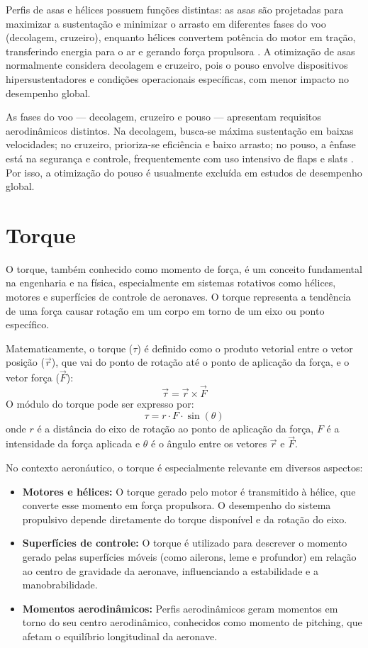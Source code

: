 Perfis de asas e hélices possuem funções distintas: as asas são projetadas para maximizar a sustentação e minimizar o arrasto em diferentes fases do voo (decolagem, cruzeiro), enquanto hélices convertem potência do motor em tração, transferindo energia para o ar e gerando força propulsora \cite{anderson2017fundamentals}. A otimização de asas normalmente considera decolagem e cruzeiro, pois o pouso envolve dispositivos hipersustentadores e condições operacionais específicas, com menor impacto no desempenho global.

As fases do voo — decolagem, cruzeiro e pouso — apresentam requisitos aerodinâmicos distintos. Na decolagem, busca-se máxima sustentação em baixas velocidades; no cruzeiro, prioriza-se eficiência e baixo arrasto; no pouso, a ênfase está na segurança e controle, frequentemente com uso intensivo de flaps e slats \cite{raymer2018aircraft}. Por isso, a otimização do pouso é usualmente excluída em estudos de desempenho global.

\section{Torque}
\label{sec:torque}
O torque, também conhecido como momento de força, é um conceito fundamental na engenharia e na física, especialmente em sistemas rotativos como hélices, motores e superfícies de controle de aeronaves. O torque representa a tendência de uma força causar rotação em um corpo em torno de um eixo ou ponto específico.

Matematicamente, o torque (\(\tau\)) é definido como o produto vetorial entre o vetor posição (\(\vec{r}\)), que vai do ponto de rotação até o ponto de aplicação da força, e o vetor força (\(\vec{F}\)):
\[
\vec{\tau} = \vec{r} \times \vec{F}
\]
O módulo do torque pode ser expresso por:
\[
\tau = r \cdot F \cdot \sin(\theta)
\]
onde \(r\) é a distância do eixo de rotação ao ponto de aplicação da força, \(F\) é a intensidade da força aplicada e \(\theta\) é o ângulo entre os vetores \(\vec{r}\) e \(\vec{F}\).

No contexto aeronáutico, o torque é especialmente relevante em diversos aspectos:
\begin{itemize}
    \item \textbf{Motores e hélices:} O torque gerado pelo motor é transmitido à hélice, que converte esse momento em força propulsora. O desempenho do sistema propulsivo depende diretamente do torque disponível e da rotação do eixo.
    \item \textbf{Superfícies de controle:} O torque é utilizado para descrever o momento gerado pelas superfícies móveis (como ailerons, leme e profundor) em relação ao centro de gravidade da aeronave, influenciando a estabilidade e a manobrabilidade.
    \item \textbf{Momentos aerodinâmicos:} Perfis aerodinâmicos geram momentos em torno do seu centro aerodinâmico, conhecidos como momento de pitching, que afetam o equilíbrio longitudinal da aeronave.
\end{itemize}

